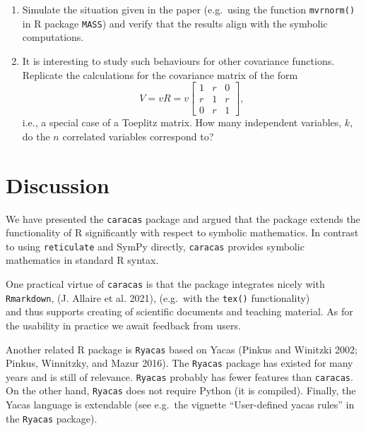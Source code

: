 \begin{enumerate}
  \begin{enumerate}
  \def\labelenumii{\alph{enumii})}
  \tightlist
  \item
    Simulate the situation given in the paper (e.g.~using the
    function \texttt{mvrnorm()} in R package \texttt{MASS})
    and verify that the results align with the symbolic computations.
  \item
    It is interesting to study such behaviours for other covariance
    functions.
    Replicate the calculations for the covariance matrix of the form
    \begin{equation}
      \label{eq:ex5}
      V = v R = v \left[\begin{matrix}1 & r & 0\\r & 1 & r\\0 & r & 1\end{matrix}\right],
    \end{equation}
    i.e., a special case of a Toeplitz matrix.
    How many independent variables, \(k\), do
    the \(n\) correlated variables correspond to?
  \end{enumerate}
\end{enumerate}

\hypertarget{discussion}{%
\section{Discussion}\label{discussion}}

We have presented the \texttt{caracas} package and argued that the
package extends the functionality of R significantly with respect to
symbolic mathematics.
In contrast to using \texttt{reticulate} and SymPy directly, \texttt{caracas}
provides symbolic mathematics in standard R syntax.

One practical virtue of \texttt{caracas} is
that the package integrates nicely with \texttt{Rmarkdown},
(J. Allaire et al. 2021), (e.g.~with the \texttt{tex()} functionality)\\
and thus supports creating of scientific documents and teaching
material. As for the usability in practice we await feedback from
users.

Another related R package is \texttt{Ryacas} based on Yacas (Pinkus and Winitzki 2002; Pinkus, Winnitzky, and Mazur 2016).
The \texttt{Ryacas} package has existed for many years and is still of relevance.
\texttt{Ryacas} probably has fewer features than \texttt{caracas}. On the other
hand, \texttt{Ryacas} does not require Python (it is compiled).
Finally, the Yacas language is extendable (see e.g.~the vignette
``User-defined yacas rules'' in the \texttt{Ryacas} package).

